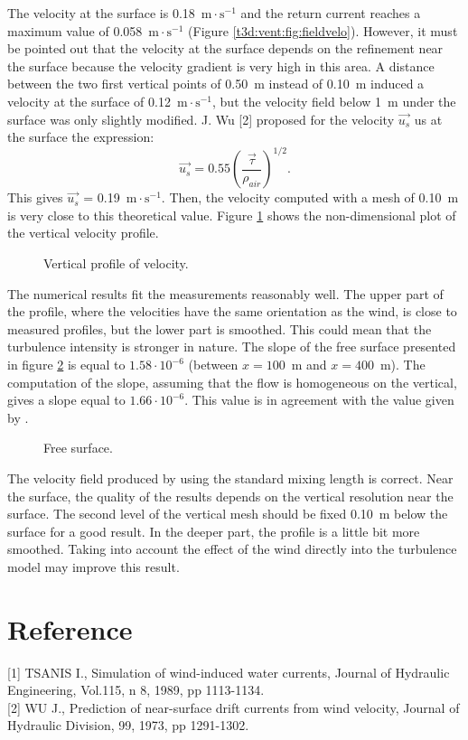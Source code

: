 \bigskip
The velocity at the surface is 0.18~$\text{m}\cdot \text{s}^{-1}$ and the return current reaches %
a maximum value of 0.058~$\text{m}\cdot \text{s}^{-1}$ (Figure \ref{t3d:vent:fig:fieldvelo}). %
However, it must be pointed out that the velocity at the surface depends
on the refinement near the surface because the velocity gradient is
very high in this area.
A distance between the two first vertical points of 0.50~m instead of
0.10~m induced a velocity at the surface of 0.12~$\text{m}\cdot \text{s}^{-1}$, but the velocity
field below 1~m under the surface was only slightly modified.
J. Wu [2] proposed for the velocity $\vec{u_s}$ us at the surface the expression:
\begin{equation*}
\vec{u_s} = 0.55 \left(\frac{\vec{\tau}}{\rho_{air}}\right)^{1/2}.
\end{equation*}
This gives $\vec{u_s}$ = 0.19~$\text{m}\cdot \text{s}^{-1}$.
Then, the velocity computed with a mesh of 0.10~m is very close to
this theoretical value.
Figure \ref{t3d:vent:fig:profileV} shows the non-dimensional plot of the vertical velocity
profile.
\begin{figure}[!htbp]
 \centering
 \caption{Vertical profile of velocity.}
 \label{t3d:vent:fig:profileV}
\end{figure}
The numerical results fit the measurements reasonably well.
The upper part of the profile, where the velocities have the same
orientation as the wind, is close to measured profiles, but the lower
part is smoothed.
This could mean that the turbulence intensity is stronger in nature.
The slope of the free surface presented in figure \ref{t3d:vent:fig:FreeSurface}
is equal to $1.58\cdot 10^{-6}$ (between $x=100$~m and $x=400$~m). %
The computation of the slope, assuming that the flow is homogeneous on the vertical,
gives a slope equal to $1.66\cdot 10^{-6}$.
This value is in agreement with the value given by .

\begin{figure}[!htbp]
 \centering
 \caption{Free surface.}
 \label{t3d:vent:fig:FreeSurface}
\end{figure}


\bigskip
The velocity field produced by  using the standard mixing length is correct.
Near the surface, the quality of the results depends on the vertical resolution near the surface.
The second level of the vertical mesh should be fixed 0.10~m below the surface for a good result.
In the deeper part, the profile is a little bit more smoothed.
Taking into account the effect of the wind directly into the turbulence model
may improve this result.

\section{Reference}

[1] TSANIS I., Simulation of wind-induced water currents,
 Journal of Hydraulic Engineering, Vol.115, n 8, 1989, pp 1113-1134.\\

[2] WU J., Prediction of near-surface drift currents from wind velocity,
 Journal of Hydraulic Division, 99, 1973, pp 1291-1302.
